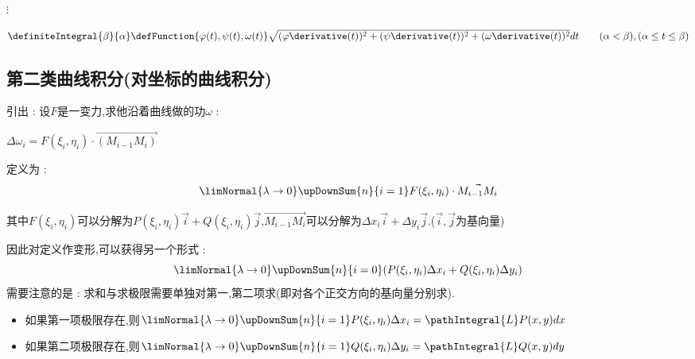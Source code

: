 {{{\begin{enumerate}
{            $\vdots$

            $\definiteIntegral{\beta}{\alpha}\defFunction{\varphi(t),\psi(t),\omega(t)}\sqrt{(\varphi\derivative(t))^2 + (\psi\derivative(t))^2 + (\omega\derivative(t))^2}dt\qquad (\alpha < \beta),(\alpha \leq t \leq \beta)$
            }
    \end{enumerate}
  }%

  \subsection{第二类曲线积分(对坐标的曲线积分)}{
    引出 : 设$F$是一变力,求他沿着曲线做的功$\omega$ :

    \begin{center}
      $\Delta\omega_i = F(\xi_i,\eta_i)\cdot\vec{(M_{i-1}M_i)}$
    \end{center}

    定义为 :
    $$
      \limNormal{\lambda \to 0}\upDownSum{n}{i = 1}F(\xi_i,\eta_i)\cdot\vec{M_{i - 1}M_i}
    $$

    其中$F(\xi_i,\eta_i)$可以分解为$P(\xi_i,\eta_i)\vec{i} + Q(\xi_i,\eta_i)\vec{j}$,$\vec{M_{i - 1}M_i}$可以分解为$\Delta x_i\vec{i} + \Delta y_i\vec{j}$.($\vec{i},\vec{j}$为基向量)

    因此对定义作变形,可以获得另一个形式 :
    $$
    \limNormal{\lambda \to 0}\upDownSum{n}{i = 0}(P(\xi_i,\eta_i)\Delta x_i + Q(\xi_i,\eta_i)\Delta y_i)
    $$
    需要注意的是 : 求和与求极限需要单独对第一,第二项求(即对各个正交方向的基向量分别求).

    \begin{itemize}
      \item 如果第一项极限存在,则$\limNormal{\lambda \to 0}\upDownSum{n}{i = 1}P(\xi_i,\eta_i)\Delta x_i = \pathIntegral{L}P(x,y)dx$
      \item 如果第二项极限存在,则$\limNormal{\lambda \to 0}\upDownSum{n}{i = 1}Q(\xi_i,\eta_i)\Delta y_i = \pathIntegral{L}Q(x,y)dy$
    \end{itemize}

}}}
